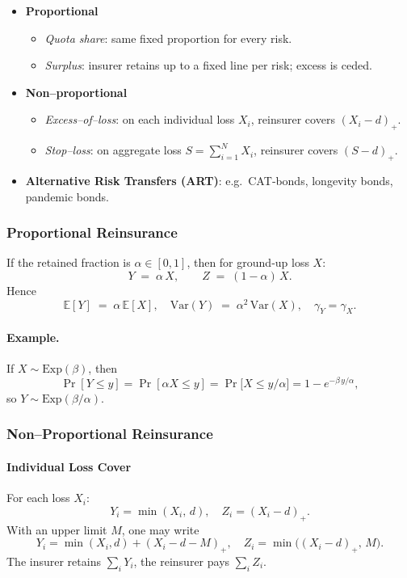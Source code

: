 \documentclass[11pt]{article}
\begin{document}
\begin{itemize}
  \item \textbf{Proportional}
    \begin{itemize}
      \item \emph{Quota share}: same fixed proportion for every risk.
      \item \emph{Surplus}: insurer retains up to a fixed line per risk; excess is ceded.
    \end{itemize}
  \item \textbf{Non–proportional}
    \begin{itemize}
      \item \emph{Excess–of–loss}: on each individual loss \(X_i\), reinsurer covers \((X_i - d)_{+}\).
      \item \emph{Stop–loss}: on aggregate loss \(S = \sum_{i=1}^N X_i\), reinsurer covers \((S - d)_{+}\).
    \end{itemize}
  \item \textbf{Alternative Risk Transfers (ART)}: e.g.\ CAT‐bonds, longevity bonds, pandemic bonds.
\end{itemize}

\subsubsection{Proportional Reinsurance}

If the retained fraction is \(\alpha\in[0,1]\), then for ground‐up loss \(X\):
\[
  Y \;=\;\alpha\,X,
  \qquad
  Z \;=\;(1-\alpha)\,X.
\]
Hence
\[
  \mathbb{E}[Y] \;=\;\alpha\,\mathbb{E}[X],
  \quad
  \text{Var}(Y) \;=\;\alpha^2\,\text{Var}(X),
  \quad
  \gamma_Y = \gamma_X.
\]
\paragraph{Example.} If \(X\sim\mathrm{Exp}(\beta)\), then
\[
  \Pr[Y \le y]
  = \Pr[\alpha X \le y]
  = \Pr\bigl[X \le y/\alpha\bigr]
  = 1 - e^{-\beta\,y/\alpha},
\]
so \(Y\sim\mathrm{Exp}(\beta/\alpha)\).

\subsubsection{Non–Proportional Reinsurance}

\paragraph{Individual Loss Cover}  
For each loss \(X_i\):
\[
  Y_i = \min(X_i,\,d),
  \quad
  Z_i = (X_i - d)_{+}.
\]
With an upper limit \(M\), one may write
\[
  Y_i = \min(X_i,d) + (X_i - d - M)_{+},
  \quad
  Z_i = \min\bigl((X_i - d)_{+},\,M\bigr).
\]
The insurer retains \(\sum_i Y_i\), the reinsurer pays \(\sum_i Z_i\).
\end{document}
